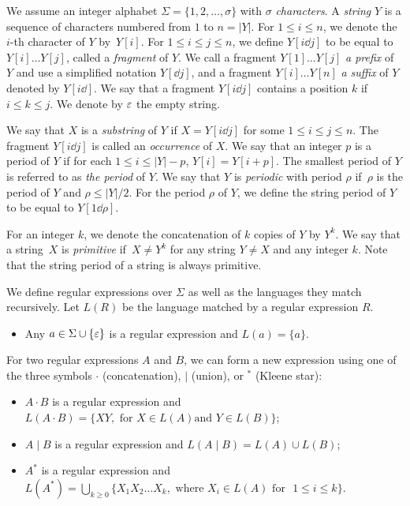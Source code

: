 We assume an integer alphabet $\Sigma = \{1, 2, \ldots, \sigma\}$ with $\sigma$ \emph{characters}. A \emph{string} $Y$ is a sequence of characters numbered from $1$ to $n = |Y|$.  For $1\le i \le n$, we denote the $i$-th character of $Y$ by~$Y[i]$. For $1\le i \le j\le n$, we define $Y[i \dd j]$ to be equal to $Y[i] \dots Y[j]$, called a \emph{fragment} of $Y$. We call a fragment $Y[1] \dots Y[j]$ \emph{a prefix} of $Y$ and use a simplified notation $Y[\dd j]$, and a fragment $Y[i] \dots Y[n]$ \emph{a suffix} of $Y$ denoted by $Y[i \dd]$. We say that a fragment $Y[i \dd j]$ contains a position $k$ if $i \le k \le j$. We denote by $\varepsilon$ the empty string.

We say that $X$ is a \emph{substring} of $Y$ if $X = Y[i \dd j]$ for some $1 \le i \le j \le n$. The fragment $Y[i \dd j]$ is called an \emph{occurrence} of $X$. 
We say that an integer $p$ is a period of $Y$ if for each $1 \le i \le |Y|-p$, $Y[i] = Y[i+p]$. The smallest period of $Y$ is referred to as \emph{the period} of $Y$. We say that $Y$ is \emph{periodic} with period $\rho$ if~$\rho$ is the period of $Y$ and $\rho  \le |Y|/2$. For the period $\rho$ of $Y$, we define the string period of $Y$ to be equal to $Y[1 \dd \rho]$. 

For an integer $k$, we denote the concatenation of $k$ copies of $Y$ by $Y^k$. We say that a string~$X$ is \emph{primitive} if~$X \neq Y^k$ for any string $Y \neq X$ and any integer $k$. Note that the string period of a string is always primitive. 

\begin{definition}
We define regular expressions over $\Sigma$ as well as the languages they match recursively. Let $L(R)$ be the language matched by a regular expression $R$.
\begin{itemize}
\item Any $a \in \Sigma \cup \{\varepsilon\}$ is a regular expression and $L(a)=\{a\}$.
\end{itemize}
For two regular expressions $A$ and $B$, we can form a new expression using one of the three symbols $\cdot$ (concatenation), $\mid$ (union), or ${}^\ast$ (Kleene star):
\begin{itemize}
\item $A \cdot B$ is a regular expression and $L(A \cdot B)=\{XY, \text{ for } X \in L(A) \text{and } Y \in L(B) \}$;
\item $A \mid B$ is a regular expression and $L(A \mid B)= L(A) \cup L(B)$;
\item $A^\ast$ is a regular expression and  $L(A^*)= \bigcup_{k  \geq 0} \{ X_1 X_2 \dots X_k, \text{ where } X_i \in L(A) \text{ for }$ $1 \leq i \leq k \}$.
\end{itemize}
\end{definition}

